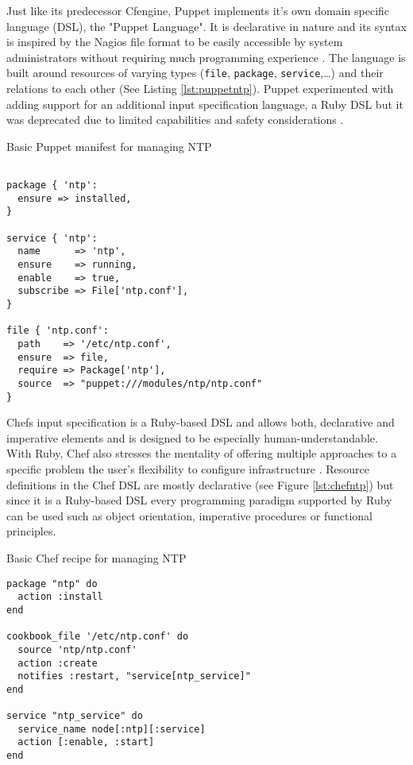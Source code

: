 Just like its predecessor Cfengine, Puppet implements it's own domain specific language (DSL), the "Puppet Language". It is declarative in nature and its syntax is inspired by the Nagios file format to be easily accessible by system administrators without requiring much programming experience \cite{puppetcomlangsum}. The language is built around resources of varying types (\texttt{file}, \texttt{package}, \texttt{service},\ldots) and their relations to each other (See Listing \ref{lst:puppetntp}). Puppet experimented with adding support for an additional input specification language, a Ruby DSL but it was deprecated due to limited capabilities and safety considerations \cite{puppetrubydsl}.

\begin{listing}[h]
\caption{Basic Puppet manifest for managing NTP}
\label{lst:puppetntp}
\begin{verbatim}

package { 'ntp':
  ensure => installed,
}

service { 'ntp':
  name      => 'ntp',
  ensure    => running,
  enable    => true,
  subscribe => File['ntp.conf'],
}

file { 'ntp.conf':
  path    => '/etc/ntp.conf',
  ensure  => file,
  require => Package['ntp'],
  source  => "puppet:///modules/ntp/ntp.conf"
}
\end{verbatim}
\end{listing}



Chefs input specification is a Ruby-based DSL \cite{pandey2012investigating} and allows both, declarative and imperative elements and is designed to be especially human-understandable. With Ruby, Chef also stresses the mentality of offering multiple approaches to a specific problem the user's flexibility to configure infrastructure \cite{chefiorecipe}. Resource definitions in the Chef DSL are mostly declarative (see Figure \ref{lst:chefntp}) but since it is a Ruby-based DSL every programming paradigm supported by Ruby can be used such as object orientation, imperative procedures or functional principles.

\begin{listing}[H]
\caption{Basic Chef recipe for managing NTP}
\label{lst:chefntp}
\begin{verbatim}
package "ntp" do
  action :install
end

cookbook_file '/etc/ntp.conf' do
  source 'ntp/ntp.conf'
  action :create
  notifies :restart, "service[ntp_service]"
end

service "ntp_service" do
  service_name node[:ntp][:service]
  action [:enable, :start]
end
\end{verbatim}
\end{listing}

